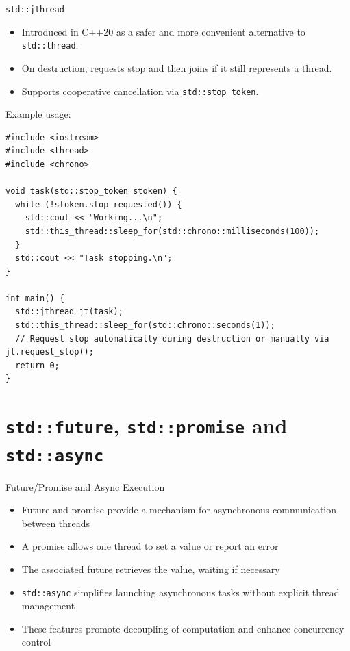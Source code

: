 \documentclass{beamer}
\begin{document}
\begin{frame}[fragile]{\texttt{std::jthread}}
  \begin{itemize}
    \item Introduced in C++20 as a safer and more convenient alternative to \texttt{std::thread}.
    \item On destruction, requests stop and then joins if it still represents a thread.
    \item Supports cooperative cancellation via \texttt{std::stop\_token}.
  \end{itemize}
  Example usage:
  \lstset{style=CStyle}
  \begin{lstlisting}
#include <iostream>
#include <thread>
#include <chrono>

void task(std::stop_token stoken) {
  while (!stoken.stop_requested()) {
    std::cout << "Working...\n";
    std::this_thread::sleep_for(std::chrono::milliseconds(100));
  }
  std::cout << "Task stopping.\n";
}

int main() {
  std::jthread jt(task);
  std::this_thread::sleep_for(std::chrono::seconds(1));
  // Request stop automatically during destruction or manually via jt.request_stop();
  return 0;
}
  \end{lstlisting}
\end{frame}

\section{\texttt{std::future}, \texttt{std::promise} and \texttt{std::async}}

\begin{frame}{Future/Promise and Async Execution}
  \begin{itemize}
    \item Future and promise provide a mechanism for asynchronous communication between threads
    \item A promise allows one thread to set a value or report an error
    \item The associated future retrieves the value, waiting if necessary
    \item \texttt{std::async} simplifies launching asynchronous tasks without explicit thread management
    \item These features promote decoupling of computation and enhance concurrency control
  \end{itemize}
\end{frame}
\end{document}
